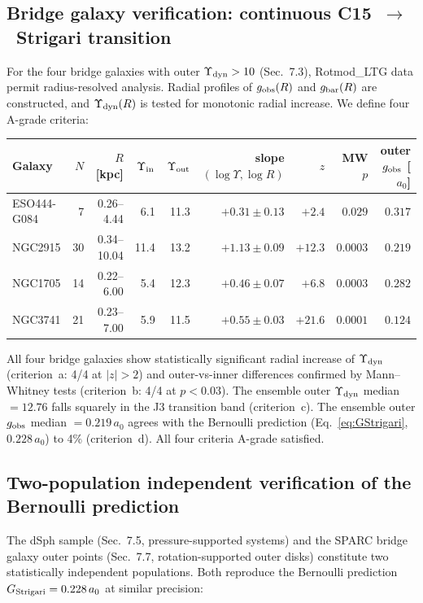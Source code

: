 \documentclass[11pt,a4paper]{article}
\newcommand{\gobs}{g_{\rm obs}}
\newcommand{\gbar}{g_{\rm bar}}
\newcommand{\ao}{a_{0}}
\newcommand{\Ydyn}{\Upsilon_{\rm dyn}}
\newcommand{\Gstr}{G_{\rm Strigari}}
\begin{document}
\subsection{Bridge galaxy verification: continuous C15~$\to$~Strigari transition}
For the four bridge galaxies with outer $\Ydyn > 10$ (Sec.~7.3), Rotmod\_LTG data permit radius-resolved
analysis. Radial profiles of $\gobs(R)$ and $\gbar(R)$ are constructed, and $\Ydyn(R)$ is tested for
monotonic radial increase. We define four A-grade criteria:

\begin{center}\small
\begin{tabular}{@{}lrrrrrrrr@{}}
\toprule
Galaxy & $N$ & $R$ [kpc] & $\Upsilon_{\rm in}$ & $\Upsilon_{\rm out}$ &
slope$(\log\Upsilon, \log R)$ & $z$ & MW $p$ & outer $\gobs$ [$\ao$] \\
\midrule
ESO444-G084 & 7 & 0.26--4.44 & 6.1 & 11.3 & $+0.31 \pm 0.13$ & $+2.4$ & $0.029$ & $0.317$ \\
NGC2915 & 30 & 0.34--10.04 & 11.4 & 13.2 & $+1.13 \pm 0.09$ & $+12.3$ & $0.0003$ & $0.219$ \\
NGC1705 & 14 & 0.22--6.00 & 5.4 & 12.3 & $+0.46 \pm 0.07$ & $+6.8$ & $0.0003$ & $0.282$ \\
NGC3741 & 21 & 0.23--7.00 & 5.9 & 11.5 & $+0.55 \pm 0.03$ & $+21.6$ & $0.0001$ & $0.124$ \\
\bottomrule
\end{tabular}
\end{center}

All four bridge galaxies show statistically significant radial increase of $\Ydyn$ (criterion~a: 4/4 at
$|z| > 2$) and outer-vs-inner differences confirmed by Mann--Whitney tests (criterion~b: 4/4 at $p < 0.03$).
The ensemble outer $\Ydyn$ median $= 12.76$ falls squarely in the J3 transition band (criterion~c). The
ensemble outer $\gobs$ median $= 0.219\,\ao$ agrees with the Bernoulli prediction (Eq.~\ref{eq:GStrigari},
$0.228\,\ao$) to 4\% (criterion~d). All four criteria A-grade satisfied.

\subsection{Two-population independent verification of the Bernoulli prediction}
The dSph sample (Sec.~7.5, pressure-supported systems) and the SPARC bridge galaxy outer points (Sec.~7.7,
rotation-supported outer disks) constitute two statistically independent populations. Both reproduce the
Bernoulli prediction $\Gstr = 0.228\,\ao$ at similar precision:
\end{document}
